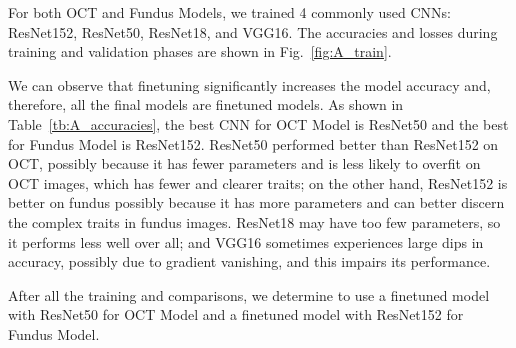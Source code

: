 \documentclass{article}
\begin{document}
\begin{multicols}{2}
	For both OCT and Fundus Models, we trained 4 commonly used CNNs: ResNet152, ResNet50, ResNet18, and VGG16. The accuracies and losses during training and validation phases are shown in Fig.~\ref{fig:A_train}. 
	
	\vspace{0.3cm}
	
	We can observe that finetuning significantly increases the model accuracy and, therefore, all the final models are finetuned models. As shown in Table~\ref{tb:A_accuracies}, the best CNN for OCT Model is ResNet50 and the best for Fundus Model is ResNet152. ResNet50 performed better than ResNet152 on OCT, possibly because it has fewer parameters and is less likely to overfit on OCT images, which has fewer and clearer traits; on the other hand, ResNet152 is better on fundus possibly because it has more parameters and can better discern the complex traits in fundus images. ResNet18 may have too few parameters, so it performs less well over all; and VGG16 sometimes experiences large dips in accuracy, possibly due to gradient vanishing, and this impairs its performance. 
	
	\vspace{0.2cm}
	
	After all the training and comparisons, we determine to use a finetuned model with ResNet50 for OCT Model and a finetuned model with ResNet152 for Fundus Model. 
	
	\end{multicols}
	
\end{document}
